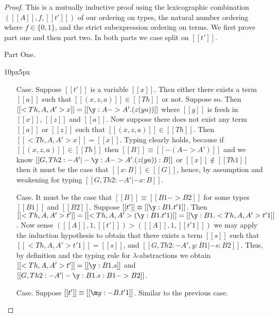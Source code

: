 \begin{proof}
  This is a mutually inductive proof using the lexicographic combination
  $([[A]], f,[[t']])$ of our ordering on types,
  the natural number ordering where $f \in \{0,1\}$, and
  the strict subexpression ordering on terms. We first prove part one
  and then part two.  In both parts we case split on $[[t']]$.

  \noindent Part One.
  \vspace{-25px}
  \begin{changemargin}{10px}{5px}\noindent
  \begin{itemize}
  \item[Case.] Suppose $[[t']]$ is a variable $[[x]]$.  Then either there exists
    a term $[[a]]$ such that $[[(x,z,a)]] \in [[Th]]$ or not.  Suppose so. Then 
    $[[<Th,A,A'>x]] = [[\y:A->A'.(z (y a))]]$ where $[[y]]$ is fresh in $[[x]]$, $[[z]]$ and $[[a]]$.
    Now suppose there does not exist any term $[[a]]$ or $[[z]]$ such that $[[(x,z,a)]] \in [[Th]]$.  Then
    $[[<Th,A,A'>x]] = [[x]]$. Typing clearly holds, because if $[[(x,z,a)]] \in [[Th]]$ then 
    $[[B]] \equiv [[{-(A->A')}]]$ and we know $[[G,Th 2:{-A'} |- \y:A->A'.(z (y a)) : B]]$ or
    $[[x]] \not\in [[Th 1]]$ then it must be the case that $[[x:B]] \in [[G]]$, hence,
    by assumption and weakening for typing $[[G,Th 2:{-A'} |- x : B]]$.

  \item[Case.] It must be the case that $[[B]] \equiv [[B1 -> B2]]$ for some types $[[B1]]$ and
    $[[B2]]$.  Suppose $[[t']] \equiv [[\y:B1.t'1]]$. Then 
    $[[<Th,A,A'>t']] = [[<Th ,A,A'>(\y:B1.t'1)]] = [[\y:B1.<Th,A,A'>t'1]]$.  Now sense
    $([[A]],1,[[t']]) > ([[A]],1,[[t'1]])$ we may apply the induction hypothesis to obtain
    that there exists a term $[[s]]$ such that $[[<Th,A,A'>t'1]] = [[s]]$, and $[[G,Th 2:{-A'},y:B1 |- s : B2]]$.
    Thus, by definition and the typing rule for $\lambda$-abstractions we obtain $[[<Th,A,A'>t']] = [[\y:B1.s]]$
    and $[[G,Th 2:{-A'} |- \y:B1.s:B1 -> B2]]$.

  \item[Case.] Suppose $[[t']] \equiv [[\m y:{-B}.t'1]]$. Similar to the previous case.


\end{itemize}
\end{changemargin}
\end{proof}
